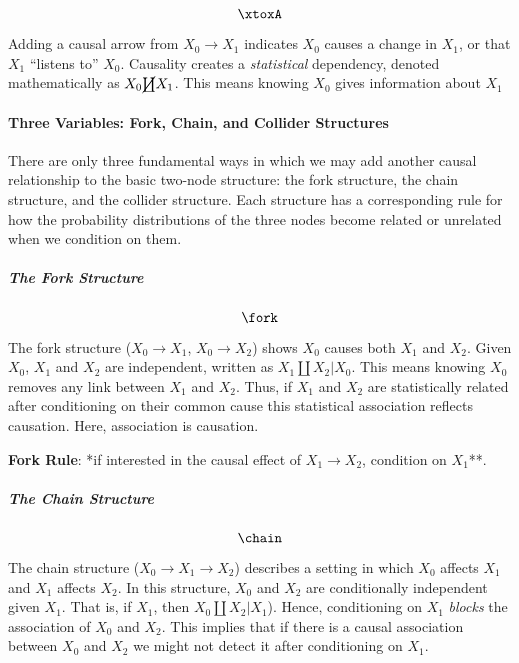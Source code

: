 \documentclass[
  singlecolumn]{article}
\let\oldparagraph\paragraph
\renewcommand{\paragraph}[1]{\oldparagraph{#1}\mbox{}}
\let\oldsubparagraph\subparagraph
\renewcommand{\subparagraph}[1]{\oldsubparagraph{#1}\mbox{}}
\begin{document}
\[\xtoxA\]

Adding a causal arrow from \(X_0 \to X_1\) indicates \(X_0\) causes a
change in \(X_1\), or that \(X_1\) ``listens to'' \(X_0\). Causality
creates a \emph{statistical} dependency, denoted mathematically as
\(X_0 \cancel\coprod X_1\). This means knowing \(X_0\) gives information
about \(X_1\)

\paragraph{Three Variables: Fork, Chain, and Collider
Structures}\label{three-variables-fork-chain-and-collider-structures}

There are only three fundamental ways in which we may add another causal
relationship to the basic two-node structure: the fork structure, the
chain structure, and the collider structure. Each structure has a
corresponding rule for how the probability distributions of the three
nodes become related or unrelated when we condition on them.

\subparagraph{The Fork Structure}\label{the-fork-structure}

\[\fork\]

The fork structure (\(X_0 \rightarrow X_1\), \(X_0 \rightarrow X_2\))
shows \(X_0\) causes both \(X_1\) and \(X_2\). Given \(X_0\), \(X_1\)
and \(X_2\) are independent, written as \(X_1 \coprod X_2 | X_0\). This
means knowing \(X_0\) removes any link between \(X_1\) and \(X_2\).
Thus, if \(X_1\) and \(X_2\) are statistically related after
conditioning on their common cause this statistical association reflects
causation. Here, association is causation.

\textbf{Fork Rule}: *if interested in the causal effect of
\(X_1 \to X_2\), condition on \(\boxed{X_1}\)**.

\subparagraph{The Chain Structure}\label{the-chain-structure}

\[\chain\]

The chain structure (\(X_0 \rightarrow X_1 \rightarrow X_2\)) describes
a setting in which \(X_0\) affects \(X_1\) and \(X_1\) affects \(X_2\).
In this structure, \(X_0\) and \(X_2\) are conditionally independent
given \(X_1\). That is, if \(\boxed{X_1}\), then
\(X_0 \coprod X_2 | X_1\)). Hence, conditioning on \(X_1\) \emph{blocks}
the association of \(X_0\) and \(X_2\). This implies that if there is a
causal association between \(X_0\) and \(X_2\) we might not detect it
after conditioning on \(\boxed{X_1}\).
\end{document}
